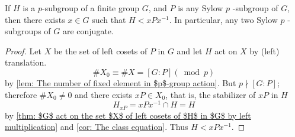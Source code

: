 \begin{theorem}
    \label{thm: Second Sylow theorem}
    If $H$ is a $p$-subgroup of a finite group $G$, and $P$ is any Sylow $p$ -subgroup of $G$, then there exists $x \in G$ such that $H<xPx^{-1}$.
    In particular, any two Sylow $p$ -subgroups of $G$ are conjugate.
    \begin{proof}
        Let $X$ be the set of left cosets of $P$ in $G$ and let $H$ act on $X$ by (left) translation.
        \begin{equation*}
            \# X_0
            \equiv
            \# X
            =
            [G: P](\bmod p)
        \end{equation*}
        by \ref{lem: The number of fixed element in $p$-group action}.
        But $p \nmid[G: P]$; therefore $\# X_0 \neq 0$ and there exists $x P \in X_0$, that is,  the stabilizer of $xP$ in $H$
        \begin{equation*}
            H_{xP}
            =
            xPx^{-1}
            \cap H
            =
            H
        \end{equation*}
        by \ref{thm: $G$ act on the set $X$ of left cosets of $H$ in $G$ by left multiplication} and \ref{cor: The class equation}. Thus $H < xPx^{-1}$.
    \end{proof}
\end{theorem}

